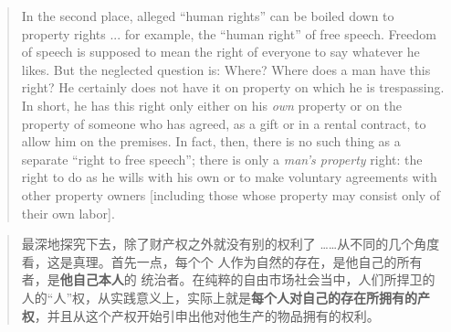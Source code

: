 \begin{paracol}{2}
\begin{quotation}
In the second place, alleged ``human rights'' can be boiled
down to property rights ... for example, the ``human right'' of
free speech. Freedom of speech is supposed to mean the right of
everyone to say whatever he likes. But the neglected question is:
Where? Where does a man have this right? He certainly does not
have it on property on which he is trespassing. In short, he has
this right only either on his \textit{own} property or on the property of
someone who has agreed, as a gift or in a rental contract, to allow
him on the premises. In fact, then, there is no such thing as a separate ``right to free speech''; there is only a \textit{man's property} right: the right to do as he wills with his own or to make voluntary
agreements with other property owners [including those whose
property may consist only of their own labor].
\end{quotation}
\switchcolumn
\begin{quotation}
最深地探究下去，除了财产权之外就没有别的权利了
……从不同的几个角度看，这是真理。首先一点，每个个
人作为自然的存在，是他自己的所有者，是\textbf{他自己本人}的
统治者。在纯粹的自由市场社会当中，人们所捍卫的人的“人”权，从实践意义上，实际上就是\textbf{每个人对自己的存在所拥有的产权}，并且从这个产权开始引申出他对他生产的物品拥有的权利。



\end{quotation}
\end{paracol}
